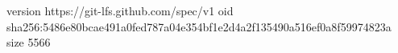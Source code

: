 version https://git-lfs.github.com/spec/v1
oid sha256:5486e80bcae491a0fed787a04e354bf1e2d4a2f135490a516ef0a8f59974823a
size 5566
